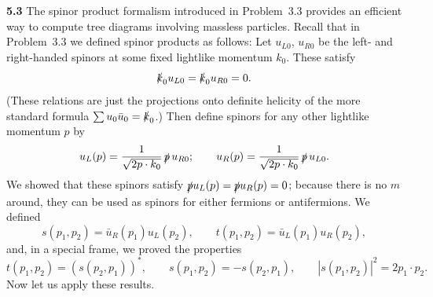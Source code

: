 \textbf{5.3} The spinor product formalism introduced in Problem~3.3 provides
an efficient way to compute tree diagrams involving massless particles.
Recall that in Problem~3.3 we defined spinor products as follows: Let
$u_{L0}$, $u_{R0}$ be the left- and right-handed spinors at some fixed
lightlike momentum $k_0$.  These satisfy
\begin{equation}
  \slashed{k}_0 u_{L0} = \slashed{k}_0 u_{R0} = 0 .
  \label{eq:5.p1}
\end{equation}
(These relations are just the projections onto definite helicity of the more
standard formula $\sum u_0\bar{u}_0 = \slashed{k}_0$.)  Then define spinors for
any other lightlike momentum $p$ by
\begin{equation}
  u_L(p) = \frac{1}{\sqrt{2p\cdot k_0}}\,\slashed{p}\,u_{R0};\qquad
  u_R(p) = \frac{1}{\sqrt{2p\cdot k_0}}\,\slashed{p}\,u_{L0} .
  \label{eq:5.p2}
\end{equation}
We showed that these spinors satisfy $\slashed{p}u_L(p) = \slashed{p}u_R(p)
= 0$; because there is no $m$ around, they can be used as spinors for either
fermions or antifermions.  We defined
\begin{equation}
  s(p_1, p_2) = \bar{u}_R(p_1)u_L(p_2),\qquad
  t(p_1, p_2) = \bar{u}_L(p_1)u_R(p_2),
\end{equation}
and, in a special frame, we proved the properties
\begin{equation}
  t(p_1,p_2) = (s(p_2,p_1))^{*},\qquad
  s(p_1,p_2) = -s(p_2,p_1),\qquad
  |s(p_1,p_2)|^2 = 2p_1\cdot p_2 .
  \label{eq:5.p3}
\end{equation}
Now let us apply these results.
